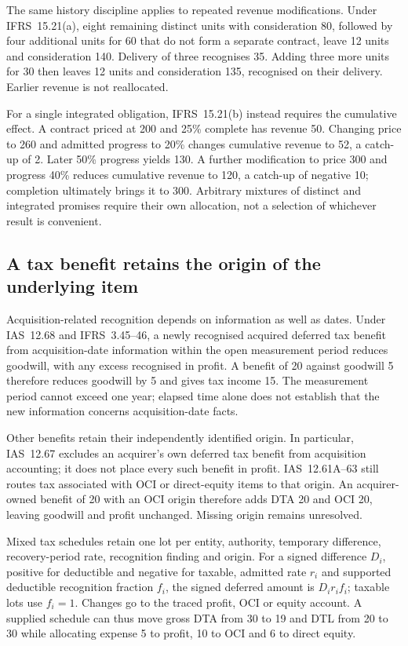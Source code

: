 The same history discipline applies to repeated revenue modifications. Under
IFRS~15.21(a), eight remaining distinct units with consideration 80, followed
by four additional units for 60 that do not form a separate contract, leave
12 units and consideration 140. Delivery of three recognises 35. Adding three
more units for 30 then leaves 12 units and consideration 135, recognised on
their delivery. Earlier revenue is not reallocated.

For a single integrated obligation, IFRS~15.21(b) instead requires the
cumulative effect. A contract priced at 200 and 25\% complete has revenue 50.
Changing price to 260 and admitted progress to 20\% changes cumulative revenue
to 52, a catch-up of 2. Later 50\% progress yields 130. A further modification
to price 300 and progress 40\% reduces cumulative revenue to 120, a catch-up
of negative 10; completion ultimately brings it to 300. Arbitrary mixtures of
distinct and integrated promises require their own allocation, not a selection
of whichever result is convenient.

\subsection{A tax benefit retains the origin of the underlying item}

Acquisition-related recognition depends on information as well as dates. Under
IAS~12.68 and IFRS~3.45--46, a newly recognised acquired deferred tax benefit
from acquisition-date information within the open measurement period reduces
goodwill, with any excess recognised in profit. A benefit of 20 against
goodwill 5 therefore reduces goodwill by 5 and gives tax income 15. The
measurement period cannot exceed one year; elapsed time alone does not establish
that the new information concerns acquisition-date facts.

Other benefits retain their independently identified origin. In particular,
IAS~12.67 excludes an acquirer's own deferred tax benefit from acquisition
accounting; it does not place every such benefit in profit. IAS~12.61A--63
still routes tax associated with OCI or direct-equity items to that origin.
An acquirer-owned benefit of 20 with an OCI origin therefore adds DTA 20 and
OCI 20, leaving goodwill and profit unchanged. Missing origin remains unresolved.

Mixed tax schedules retain one lot per entity, authority, temporary difference,
recovery-period rate, recognition finding and origin. For a signed difference
\(D_i\), positive for deductible and negative for taxable, admitted rate
\(r_i\) and supported deductible recognition fraction \(f_i\), the signed
deferred amount is \(D_i r_i f_i\); taxable lots use \(f_i=1\). Changes go
to the traced profit, OCI or equity account. A supplied schedule can thus move
gross DTA from 30 to 19 and DTL from 20 to 30 while allocating expense 5 to
profit, 10 to OCI and 6 to direct equity.

